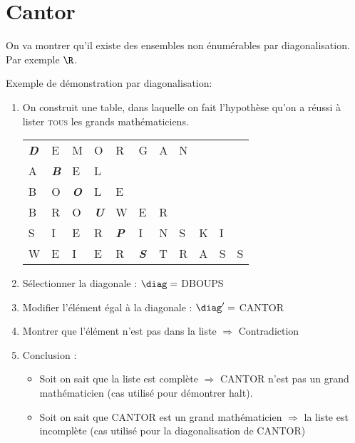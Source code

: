 
\section{Cantor}
\label{sec:cantor}
On va montrer qu'il existe des ensembles non énumérables par diagonalisation. Par exemple $\R$.
\begin{myexem}
	Exemple de démonstration par diagonalisation:
	\begin{enumerate}
		\item On construit une table, dans laquelle on fait l'hypothèse qu'on a réussi à lister \textsc{tous} les grands mathématiciens.\\
			\begin{tabular}{lllllllllll}
				\emph{\textbf{D}}&E& M&O&R&G&A&N&&& \\
				A&\emph{\textbf{B}}&E&L&&&&&&&\\
				B&O&\emph{\textbf{O}}&L&E&&&&&&\\
				B&R&O&\emph{\textbf{U}}&W&E&R&&&&\\
				S&I&E&R&\emph{\textbf{P}}&I&N&S&K&I&\\
				W&E&I&E&R&\emph{\textbf{S}}&T&R&A&S&S\\
			\end{tabular}
		\item Sélectionner la diagonale : $\diag = $ DBOUPS
		\item Modifier l'élément égal à la diagonale : $\diag' =$ CANTOR
		\item Montrer que l'élément n'est pas dans la liste $\Rightarrow$ Contradiction
		\item Conclusion :
			\begin{itemize}
				\item Soit on sait que la liste est complète
					\subitem $ \Rightarrow$ CANTOR n'est pas un grand
				mathématicien (cas utilisé pour démontrer
				halt).
				\item Soit on sait que CANTOR est un grand
					mathématicien 
					\subitem $ \Rightarrow$ la liste est incomplète
				(cas utilisé pour la diagonalisation de CANTOR)
			\end{itemize}
	\end{enumerate}
\end{myexem}

